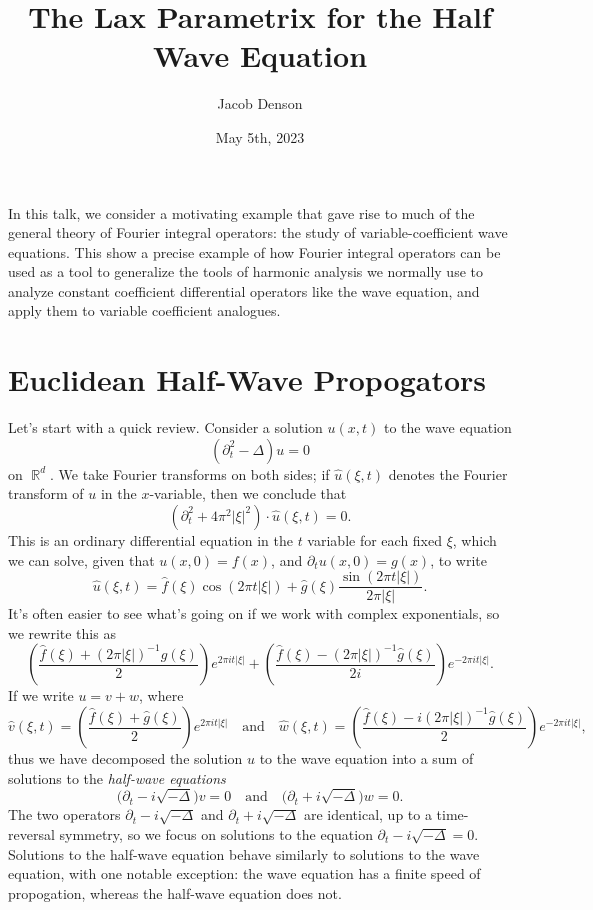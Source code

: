 \documentclass{article}
\title{The Lax Parametrix for the Half Wave Equation}
\author{Jacob Denson}
\date{May 5th, 2023}
\theoremstyle{plain}
\theoremstyle{remark}
\theoremstyle{definition}
\DeclareMathOperator{\RR}{\mathbb{R}}
\begin{document}
\maketitle

In this talk, we consider a motivating example that gave rise to much of the general theory of Fourier integral operators: the study of variable-coefficient wave equations. This show a precise example of how Fourier integral operators can be used as a tool to generalize the tools of harmonic analysis we normally use to analyze constant coefficient differential operators like the wave equation, and apply them to variable coefficient analogues.

\section{Euclidean Half-Wave Propogators}

Let's start with a quick review. Consider a solution $u(x,t)$ to the wave equation
%
\[ (\partial_t^2 - \Delta) u = 0 \]
%
on $\RR^d$. We take Fourier transforms on both sides; if $\widehat{u}(\xi,t)$ denotes the Fourier transform of $u$ in the $x$-variable, then we conclude that
%
\[ (\partial_t^2 + 4 \pi^2 |\xi|^2) \cdot \widehat{u}(\xi,t) = 0. \]
%
This is an ordinary differential equation in the $t$ variable for each fixed $\xi$, which we can solve, given that $u(x,0) = f(x)$, and $\partial_t u(x,0) = g(x)$, to write
%
\[ \widehat{u}(\xi,t) = \widehat{f}(\xi) \cos(2 \pi t |\xi|) + \widehat{g}(\xi) \frac{\sin(2 \pi t |\xi|)}{2 \pi |\xi|}. \]
%
It's often easier to see what's going on if we work with complex exponentials, so we rewrite this as
%
\[ \left( \frac{\widehat{f}(\xi) + (2 \pi |\xi|)^{-1} \widehat{g}(\xi)}{2} \right) e^{2 \pi i t |\xi|} + \left( \frac{\widehat{f}(\xi) - (2 \pi |\xi|)^{-1} \widehat{g}(\xi)}{2i} \right) e^{-2 \pi i t |\xi|}. \]
%
If we write $u = v + w$, where
%
\[ \widehat{v}(\xi,t) = \left( \frac{\widehat{f}(\xi) + \widehat{g}(\xi)}{2} \right) e^{2 \pi i t |\xi|} \quad\text{and}\quad \widehat{w}(\xi,t) = \left( \frac{\widehat{f}(\xi) - i (2 \pi |\xi|)^{-1} \widehat{g}(\xi)}{2} \right) e^{-2 \pi i t |\xi|}, \]
%
thus we have decomposed the solution $u$ to the wave equation into a sum of solutions to the \emph{half-wave equations}
%
\[ \Big( \partial_t - i \sqrt{-\Delta} \Big) v = 0 \quad\text{and}\quad \Big(\partial_t + i \sqrt{-\Delta} \Big) w = 0. \]
%
The two operators $\partial_t - i \sqrt{-\Delta}$ and $\partial_t + i \sqrt{-\Delta}$ are identical, up to a time-reversal symmetry, so we focus on solutions to the equation $\partial_t - i \sqrt{-\Delta} = 0$. Solutions to the half-wave equation behave similarly to solutions to the wave equation, with one notable exception: the wave equation has a finite speed of propogation, whereas the half-wave equation does not.
\end{document}
